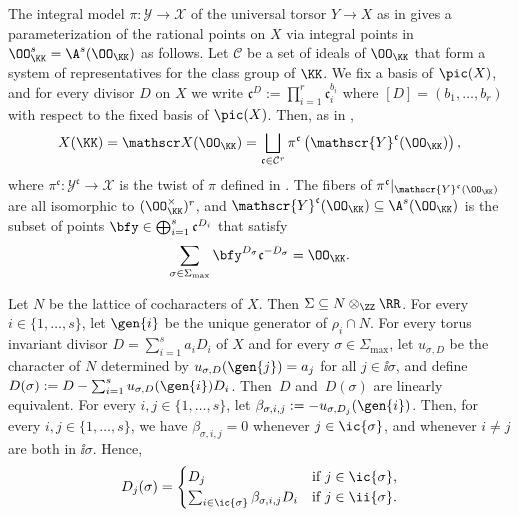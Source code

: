 The integral model $\pi:\mathscr{Y}\to\mathscr{X}$ of the universal torsor $Y\to X$
as in \cite[Rem.\,8.6]{MR1679841} gives a parameterization of the rational points
on $X$ via integral points in $\OO_{\KK}^s=\A^s(\OO_{\KK})$ as follows.
Let $\mathcal{C}$ be a set of ideals of $\OO_{\KK}$ that form a system of representatives
for the class group of $\KK$.
We fix a basis of $\pic(X)$, and
for every divisor $D$ on $X$ we write $\mathfrak c^{D}:=\prod_{i=1}^r \mathfrak c_i^{b_i}$ where
$[D]=(b_1,\dots,b_r)$ with respect to the fixed basis of $\pic(X)$.
Then, as in \cite[\S2]{MR3514738},
\[
X(\KK)=\mathscr X(\OO_{\KK})=
\bigsqcup_{\mathfrak c\in\mathcal C^{r}}\pi^{\mathfrak c}
\left(\mathscr{Y}^{\mathfrak c}(\OO_{\KK})\right),
\]
where $\pi^{\mathfrak c}:\mathscr{Y}^{\mathfrak c}\to\mathscr X$ is the twist
of $\pi$ defined in \cite[Th.\,2.7]{MR3552013}.
The fibers of $\pi^{\mathfrak c}|_{\mathscr{Y}^{\mathfrak c}(\OO_{\KK})}$ are all isomorphic to
$(\OO_{\KK}^\times)^{r}$, and
$\mathscr{Y}^{\mathfrak c}(\OO_{\KK})\subseteq \A^s(\OO_{\KK})$ is the subset of
points $\bfy\in \bigoplus_{i=1}^s\mathfrak c^{D_i}$ that satisfy
\begin{equation}
\label{eq:coprimality_condition}
\sum_{\sigma\in\Sigma_{\max}}\bfy^{D_\sigma}\mathfrak c^{-D_\sigma}=\OO_{\KK}.
\end{equation}

Let $N$ be the lattice of cocharacters of $X$. Then $\Sigma\subseteq N\otimes_\ZZ\RR$.
For every $i\in\{1,\dots,s\}$, let $\gen{i}$ be the unique generator of $\rho_i\cap N$.
For every torus invariant divisor $D=\sum_{i=1}^s a_i D_i$ of $X$ and for every
$\sigma\in\Sigma_{\max}$, let $u_{\sigma,D}$ be the character of $N$ deter\-mined by
$u_{\sigma,D}(\gen{j})=a_j$ for all $j\in\ii{\sigma}$, and define
$D(\sigma):=D-\sum_{i=1}^su_{\sigma,D}(\gen{i})D_i$.
Then~$D$ and~$D(\sigma)$ are linearly equivalent.
For every $i,j\in\{1,\dots,s\}$, let $\beta_{\sigma,i,j}:=-u_{\sigma,D_{j}}(\gen{i})$.
Then, for every $i,j \in\{1,\dots,s\}$, we have $\beta_{\sigma,i,j}=0$ whenever
$j\in\ic{\sigma}$, and whenever $i \neq j$ are both in $\ii{\sigma}$. Hence,
\begin{equation}
\label{eq:D_rho_sigma}
D_{j}(\sigma)=\begin{cases}
D_{j} & \text{if } j\in\ic{\sigma},\\
\sum_{i\in\ic{\sigma}}\beta_{\sigma,i,j}D_{i} & \text{if } j\in\ii{\sigma}.
\end{cases}
\end{equation}

